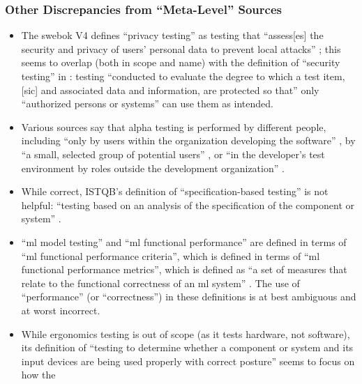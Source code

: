 \subsubsection{Other Discrepancies from ``Meta-Level'' Sources}

\begin{itemize}
      \item The \acs{swebok} V4 defines ``privacy testing'' as testing that ``assess[es]
            the security and privacy of users' personal data to prevent local
            attacks'' \citep[p.~5-10]{SWEBOK2024}; this seems to overlap
            (both in scope and name) with
            the definition of ``security testing'' in \citep{IEEE2022}: testing
            ``conducted to evaluate the degree to which a test item, [sic] and
            associated data and information, are protected so that'' only
            ``authorized persons or systems'' can use them as intended.
      \item Various sources say that alpha testing is performed by different
            people, including ``only by users within the organization
            developing the software'' \citep[p.~17]{IEEE2017}, by ``a small,
            selected group of potential users'' \citep[p.~5-8]{SWEBOK2024}, or
            ``in the developer's test environment by roles outside the
            development organization'' \citepISTQB{}.
            \ifnotpaper
      \item While correct, ISTQB's definition of ``specification-based testing''
            is not helpful: ``testing based on an analysis of the specification
            of the component or system'' \citepISTQB{}.
            \fi
      \item ``\acf{ml} model testing'' and ``\acs{ml} functional performance'' are defined
            in terms of ``\acs{ml} functional performance criteria'', which is defined
            in terms of ``\acs{ml} functional performance metrics'', which is defined
            as ``a set of measures that relate to the functional correctness of
            an \acs{ml} system'' \citepISTQB{}. The use of ``performance'' (or
            ``correctness'') in these definitions is at best ambiguous and at
            worst incorrect.
            \ifnotpaper
      \item While ergonomics testing is out of scope (as it tests hardware, not
            software), its definition of ``testing to determine whether a
            component or system and its input devices are being used properly
            with correct posture'' \citepISTQB{} seems to focus on how the

\end{itemize}
